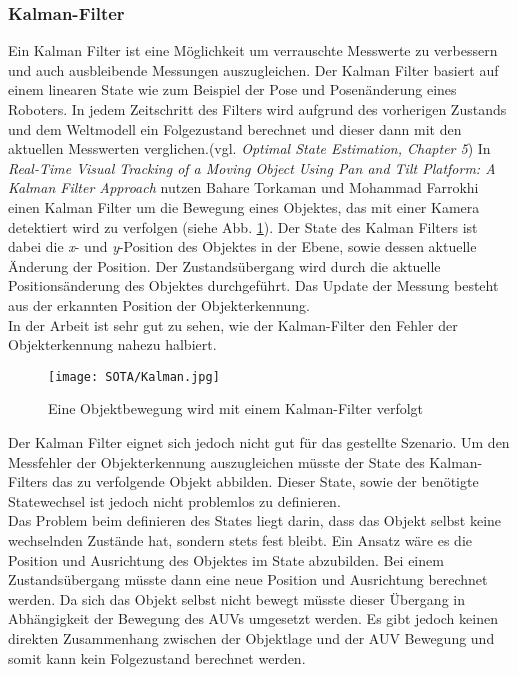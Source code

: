 \subsubsection{Kalman-Filter}
Ein Kalman Filter ist eine Möglichkeit um verrauschte Messwerte zu verbessern und auch ausbleibende Messungen auszugleichen. Der Kalman Filter basiert auf einem linearen State wie zum Beispiel der Pose und Posenänderung eines Roboters. In jedem Zeitschritt des Filters wird aufgrund des vorherigen Zustands und dem Weltmodell ein Folgezustand berechnet und dieser dann mit den aktuellen Messwerten verglichen.(vgl. \textit{Optimal State Estimation, Chapter 5}\cite{simon2006optimal})
In \textit{Real-Time Visual Tracking of a Moving Object Using Pan and Tilt Platform: A Kalman Filter Approach}\cite{torkaman2012real} nutzen Bahare Torkaman und Mohammad Farrokhi einen Kalman Filter um die Bewegung eines Objektes, das mit einer Kamera detektiert wird zu verfolgen (siehe Abb. \ref{kalmanFilter}). Der State des Kalman Filters ist dabei die \textit{x}- und \textit{y}-Position des Objektes in der Ebene, sowie dessen aktuelle Änderung der Position. Der Zustandsübergang wird durch die aktuelle Positionsänderung des Objektes durchgeführt. Das Update der Messung besteht aus der erkannten Position der Objekterkennung.\\
In der Arbeit ist sehr gut zu sehen, wie der Kalman-Filter den Fehler der Objekterkennung nahezu halbiert.\\
\begin{figure}[H]
\centering
\texttt{[image: SOTA/Kalman.jpg]}
\caption{Eine Objektbewegung wird mit einem Kalman-Filter verfolgt}
\label{kalmanFilter}
\end{figure}
Der Kalman Filter eignet sich jedoch nicht gut für das gestellte Szenario. Um den Messfehler der Objekterkennung auszugleichen müsste der State des Kalman-Filters das zu verfolgende Objekt abbilden. Dieser State, sowie der benötigte Statewechsel ist jedoch nicht problemlos zu definieren.\\
Das Problem beim definieren des States liegt darin, dass das Objekt selbst keine wechselnden Zustände hat, sondern stets fest bleibt. Ein Ansatz wäre es die Position und Ausrichtung des Objektes im State abzubilden. Bei einem Zustandsübergang müsste dann eine neue Position und Ausrichtung berechnet werden. Da sich das Objekt selbst nicht bewegt müsste dieser Übergang in Abhängigkeit der Bewegung des AUVs umgesetzt werden. Es gibt jedoch keinen direkten Zusammenhang zwischen der Objektlage und der AUV Bewegung und somit kann kein Folgezustand berechnet werden. 
